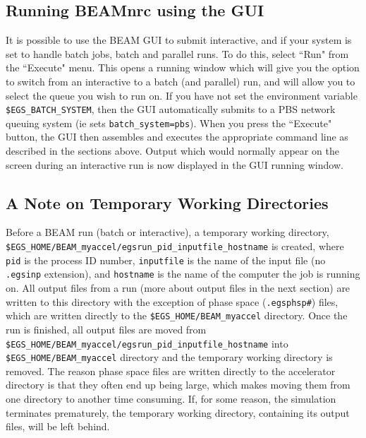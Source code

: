 \documentclass[12pt,twoside]{article}
\begin{document}
\subsection{Running BEAMnrc using the GUI}

It is possible to use the BEAM GUI to submit interactive, and if your
system is set to handle batch jobs, batch and parallel runs.  To do this,
select ``Run" from the ``Execute" menu.  This opens a running window which
will give you the option to switch from an interactive to a batch (and
parallel) run, and will allow you to select the queue you wish to run on.
If you have not set the environment variable {\tt \$EGS\_BATCH\_SYSTEM},
then the GUI automatically submits to a PBS network queuing system (ie
sets {\tt batch\_system=pbs}).  When you press the ``Execute" button, the
GUI then assembles and executes the appropriate command line as described
in the sections above.  Output which would normally appear on the screen
during an interactive run is now displayed in the GUI running window.

\subsection{A Note on Temporary Working Directories}
\label{twdsect}

Before a BEAM run (batch or interactive), a temporary working directory,\\
{\tt \$EGS\_HOME/BEAM\_myaccel/egsrun\_pid\_inputfile\_hostname} is
created, where {\tt pid} is the process ID number, {\tt inputfile} is
the name of the input file (no {\tt .egsinp} extension), and {\tt hostname}
is the name of the computer the job is running on.  All output
files from a run (more about output files in the next section)
are written to this directory with the exception of
phase space ({\tt .egsphsp\#}) files, which are written directly to
the {\tt \$EGS\_HOME/BEAM\_myaccel} directory.  Once the run is finished,
all output files are moved from \\
{\tt \$EGS\_HOME/BEAM\_myaccel/egsrun\_pid\_inputfile\_hostname} into {\tt \$EGS\_HOME/BEAM\_myaccel} directory and the temporary
working directory is removed.  The reason phase space files are written
directly to the accelerator directory is that they often end up
being large, which makes moving them from one directory to another time
consuming.  If, for some reason, the simulation terminates prematurely, the temporary working directory, containing its output files, will be left behind.
\end{document}
